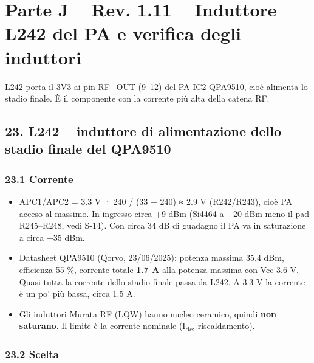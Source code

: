 \clearpage
\section[Parte J – Rev. 1.11 – Induttore L242 del PA e verifica degli induttori]{Parte J – Rev. 1.11 – Induttore L242 del PA e verifica degli induttori}

L242 porta il 3V3 ai pin RF\_\allowbreak{}OUT (9–12) del PA IC2 QPA9510, cioè alimenta lo stadio finale. È il componente con la corrente più alta della catena RF.

\subsection[23. L242 – induttore di alimentazione dello stadio finale del QPA9510]{23. L242 – induttore di alimentazione dello stadio finale del QPA9510 }

\subsubsection[23.1 Corrente]{23.1 Corrente}

\begin{itemize}
\item APC1/\allowbreak{}APC2 = 3.3 V · 240 /\allowbreak{} (33 + 240) ≈ 2.9 V (R242/\allowbreak{}R243), cioè PA acceso al massimo. In ingresso circa +9 dBm (Si4464 a +20 dBm meno il pad R245–R248, vedi S-14). Con circa 34 dB di guadagno il PA va in saturazione a circa +35 dBm.
\item Datasheet QPA9510 (Qorvo, 23/\allowbreak{}06/\allowbreak{}2025): potenza massima 35.4 dBm, efficienza 55 \%, corrente totale \textbf{1.7 A} alla potenza massima con Vcc 3.6 V. Quasi tutta la corrente dello stadio finale passa da L242. A 3.3 V la corrente è un po' più bassa, circa 1.5 A.
\item Gli induttori Murata RF (LQW) hanno nucleo ceramico, quindi \textbf{non saturano}. Il limite è la corrente nominale (I\textsubscript{dc}, riscaldamento).
\end{itemize}

\subsubsection[23.2 Scelta]{23.2 Scelta}

